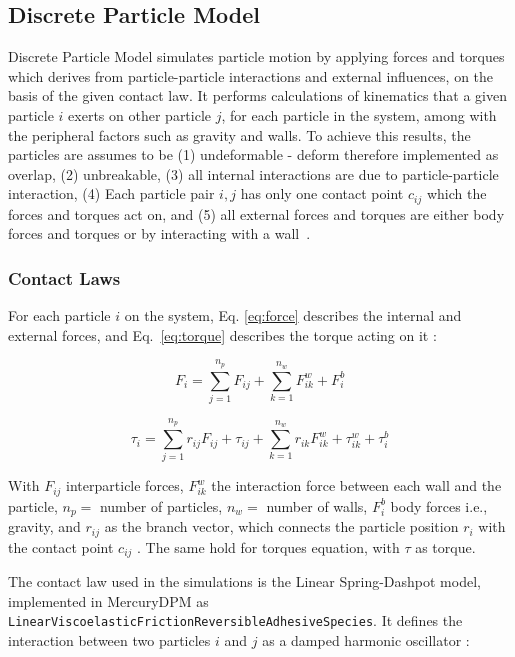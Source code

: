 
 \subsection{Discrete Particle Model}
 Discrete Particle Model simulates particle motion by applying forces and torques which derives from particle-particle interactions and external influences, on the basis of the given contact law. It performs calculations of kinematics that a given particle $i$ exerts on other particle $j$, for each particle in the system, among with the peripheral factors such as gravity and walls. To achieve this results, the particles are assumes to be (1) undeformable - deform therefore implemented as overlap, (2) unbreakable, (3) all internal interactions are due to particle-particle interaction, (4) Each particle pair $i, j$ has only one contact point $c_{ij}$ which the forces and torques act on, and (5) all external forces and torques are either body forces and torques or by interacting with a wall~\cite{MercuryDPM}. 

\subsubsection{Contact Laws}
For each particle $i$ on the system, Eq. \ref{eq:force} describes the internal and external forces, and Eq.~\ref{eq:torque} describes the torque acting on it \cite{MercuryDPM}:

\begin{equation} \label{eq:force}
 F_i = \sum_{j=1}^{n_p} F_{ij} + \sum_{k=1}^{n_w} F_{ik}^w + F_i^b
\end{equation}

\begin{equation} \label{eq:torque}
 \tau_i = \sum_{j=1}^{n_p} r_{ij}F_{ij} + \tau_{ij} + \sum_{k=1}^{n_w} r_{ik}F_{ik}^w + \tau_{ik}^w +\tau_{i}^{b} 
\end{equation}

With $F_{ij}$ interparticle forces, $F_{ik}^w$ the interaction force between each wall and the particle, $n_p =$ number of particles, $n_w =$ number of walls, $F_i^b$ body forces i.e., gravity, and $r_{ij}$ as the branch vector, which connects the particle position $r_i$ with the contact point $c_{ij}$ . The same hold for torques equation, with $\tau$ as torque. 

The contact law used in the simulations is the Linear Spring-Dashpot model, implemented in MercuryDPM as 
\texttt{LinearViscoelasticFrictionReversibleAdhesiveSpecies}. It defines the interaction between two particles $i$ and $j$ as a damped harmonic oscillator \cite{LSD-info}:

